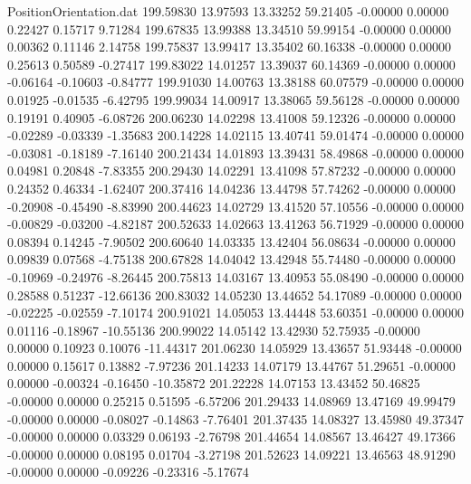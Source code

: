 \begin{filecontents}{PositionOrientation.dat}
 199.59830   13.97593   13.33252    59.21405   -0.00000    0.00000    0.22427    0.15717    9.71284
 199.67835   13.99388   13.34510    59.99154   -0.00000    0.00000    0.00362    0.11146    2.14758
 199.75837   13.99417   13.35402    60.16338   -0.00000    0.00000    0.25613    0.50589   -0.27417
 199.83022   14.01257   13.39037    60.14369   -0.00000    0.00000   -0.06164   -0.10603   -0.84777
 199.91030   14.00763   13.38188    60.07579   -0.00000    0.00000    0.01925   -0.01535   -6.42795
 199.99034   14.00917   13.38065    59.56128   -0.00000    0.00000    0.19191    0.40905   -6.08726
 200.06230   14.02298   13.41008    59.12326   -0.00000    0.00000   -0.02289   -0.03339   -1.35683
 200.14228   14.02115   13.40741    59.01474   -0.00000    0.00000   -0.03081   -0.18189   -7.16140
 200.21434   14.01893   13.39431    58.49868   -0.00000    0.00000    0.04981    0.20848   -7.83355
 200.29430   14.02291   13.41098    57.87232   -0.00000    0.00000    0.24352    0.46334   -1.62407
 200.37416   14.04236   13.44798    57.74262   -0.00000    0.00000   -0.20908   -0.45490   -8.83990
 200.44623   14.02729   13.41520    57.10556   -0.00000    0.00000   -0.00829   -0.03200   -4.82187
 200.52633   14.02663   13.41263    56.71929   -0.00000    0.00000    0.08394    0.14245   -7.90502
 200.60640   14.03335   13.42404    56.08634   -0.00000    0.00000    0.09839    0.07568   -4.75138
 200.67828   14.04042   13.42948    55.74480   -0.00000    0.00000   -0.10969   -0.24976   -8.26445
 200.75813   14.03167   13.40953    55.08490   -0.00000    0.00000    0.28588    0.51237  -12.66136
 200.83032   14.05230   13.44652    54.17089   -0.00000    0.00000   -0.02225   -0.02559   -7.10174
 200.91021   14.05053   13.44448    53.60351   -0.00000    0.00000    0.01116   -0.18967  -10.55136
 200.99022   14.05142   13.42930    52.75935   -0.00000    0.00000    0.10923    0.10076  -11.44317
 201.06230   14.05929   13.43657    51.93448   -0.00000    0.00000    0.15617    0.13882   -7.97236
 201.14233   14.07179   13.44767    51.29651   -0.00000    0.00000   -0.00324   -0.16450  -10.35872
 201.22228   14.07153   13.43452    50.46825   -0.00000    0.00000    0.25215    0.51595   -6.57206
 201.29433   14.08969   13.47169    49.99479   -0.00000    0.00000   -0.08027   -0.14863   -7.76401
 201.37435   14.08327   13.45980    49.37347   -0.00000    0.00000    0.03329    0.06193   -2.76798
 201.44654   14.08567   13.46427    49.17366   -0.00000    0.00000    0.08195    0.01704   -3.27198
 201.52623   14.09221   13.46563    48.91290   -0.00000    0.00000   -0.09226   -0.23316   -5.17674

\end{filecontents}

